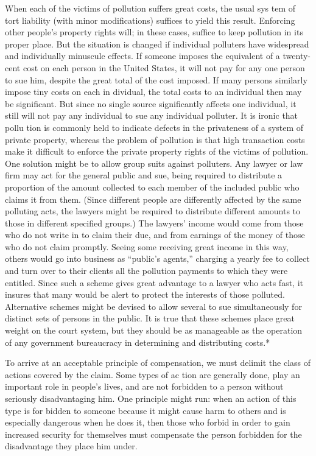 \documentclass[11pt,openany]{book}
\begin{document}
When each of the victims of pollution suffers great costs, the usual sys tem of tort liability (with minor modifications) suffices to yield this result. Enforcing other people's property rights will; in these cases, suffice to keep pollution in its proper place. But the situation is changed if individual polluters have widespread and individually minuscule effects. If someone imposes the equivalent of a twenty-cent cost on each person in the United States, it will not pay for any one person to sue him, despite the great total of the cost imposed. If many persons similarly impose tiny costs on each in dividual, the total costs to an individual then may be significant. But since no single source significantly affects one individual, it still will not pay any individual to sue any individual polluter. It is ironic that pollu tion is commonly held to indicate defects in the privateness of a system of private property, whereas the problem of pollution is that high transaction costs make it difficult to enforce the private property rights of the victims of pollution. One solution might be to allow group suits against polluters. Any lawyer or law firm may act for the general public and sue, being required to distribute a proportion of the amount collected to each member of the included public who claims it from them. (Since different people are differently affected by the same polluting acts, the lawyers might be required to distribute different amounts to those in different specified groups.) The lawyers' income would come from those who do not write in to claim their due, and from earnings of the money of those who do not claim promptly. Seeing some receiving great income in this way, others would go into business as ``public's agents,'' charging a yearly fee to collect and turn over to their clients all the pollution payments to which they were entitled. Since such a scheme gives great advantage to a lawyer who acts fast, it insures that many would be alert to protect the interests of those polluted. Alternative schemes might be devised to allow several to sue simultaneously for distinct sets of persons in the public. It is true that these schemes place great weight on the court system, but they should be as manageable as the operation of any government bureaucracy in determining and distributing costs.* 

To arrive at an acceptable principle of compensation, we must delimit the class of actions covered by the claim. Some types of ac tion are generally done, play an important role in people's lives, and are not forbidden to a person without seriously disadvantaging him. One principle might run: when an action of this type is for bidden to someone because it might cause harm to others and is especially dangerous when he does it, then those who forbid in order to gain increased security for themselves must compensate the person forbidden for the disadvantage they place him under. 
\end{document}
